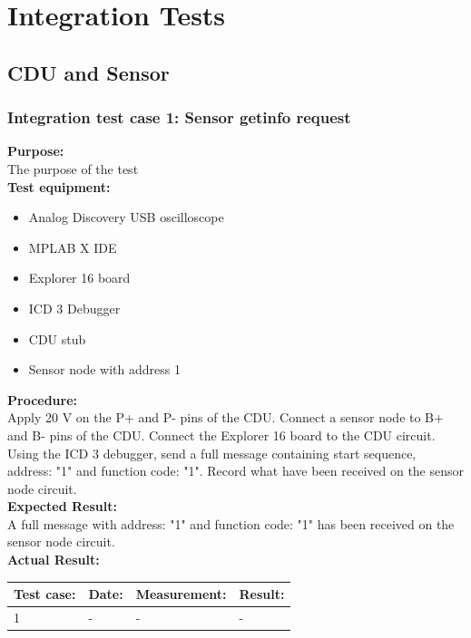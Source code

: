 \chapter{Integration Tests}

\section{CDU and Sensor}
\subsection{Integration test case 1: Sensor getinfo request}
\textbf{Purpose:}\\
The purpose of the test\\

\textbf{Test equipment:}
\begin{itemize}
\item Analog Discovery USB oscilloscope
\item MPLAB X IDE
\item Explorer 16 board
\item ICD 3 Debugger
\item CDU stub
\item Sensor node with address 1
\end{itemize}

\textbf{Procedure:}\\
Apply 20 V on the P+ and P- pins of the CDU. Connect a sensor node to B+ and B- pins of the CDU. Connect the Explorer 16 board to the CDU circuit. Using the ICD 3 debugger, send a full message containing start sequence, address: "1" and function code: "1". Record what have been received on the sensor node circuit.\\

\textbf{Expected Result:}\\
A full message with address: "1" and function code: "1" has been received on the sensor node circuit.\\

\textbf{Actual Result:}\\
\begin{table}[H]
\centering
\begin{tabular}{|p{2cm}|p{2cm}|p{3cm}|p{2cm}|}\hline
\textbf{Test case:} & \textbf{Date:} & \textbf{Measurement:} & \textbf{Result:} \\ \hline
1 & - & - & - \\ \hline
\end{tabular}
\end{table}

